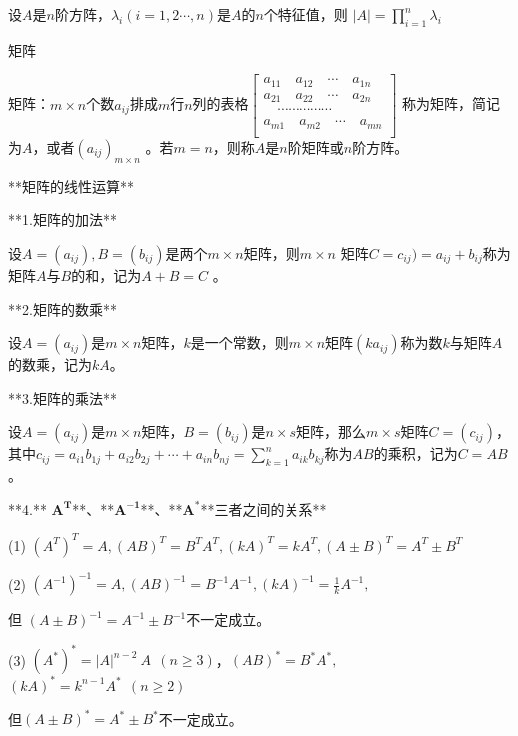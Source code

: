 设$A$是$n$阶方阵，$\lambda_{i}(i = 1,2\cdots,n)$是$A$的$n$个特征值，则
$|A| = \prod_{i = 1}^{n}\lambda_{i}$

矩阵

矩阵：$m \times n$个数$a_{{ij}}$排成$m$行$n$列的表格$\begin{bmatrix}  a_{11}\quad a_{12}\quad\cdots\quad a_{1n} \\ a_{21}\quad a_{22}\quad\cdots\quad a_{2n} \\ \quad\cdots\cdots\cdots\cdots\cdots \\  a_{m1}\quad a_{m2}\quad\cdots\quad a_{{mn}} \\ \end{bmatrix}$ 称为矩阵，简记为$A$，或者$\left( a_{{ij}} \right)_{m \times n}$ 。若$m = n$，则称$A$是$n$阶矩阵或$n$阶方阵。

**矩阵的线性运算**

**1.矩阵的加法**

设$A = (a_{{ij}}),B = (b_{{ij}})$是两个$m \times n$矩阵，则$m \times n$ 矩阵$C = c_{{ij}}) = a_{{ij}} + b_{{ij}}$称为矩阵$A$与$B$的和，记为$A + B = C$ 。

**2.矩阵的数乘**

设$A = (a_{{ij}})$是$m \times n$矩阵，$k$是一个常数，则$m \times n$矩阵$(ka_{{ij}})$称为数$k$与矩阵$A$的数乘，记为${kA}$。

**3.矩阵的乘法**

设$A = (a_{{ij}})$是$m \times n$矩阵，$B = (b_{{ij}})$是$n \times s$矩阵，那么$m \times s$矩阵$C = (c_{{ij}})$，其中$c_{{ij}} = a_{i1}b_{1j} + a_{i2}b_{2j} + \cdots + a_{{in}}b_{{nj}} = \sum_{k =1}^{n}{a_{{ik}}b_{{kj}}}$称为${AB}$的乘积，记为$C = AB$ 。

**4.** $\mathbf{A}^{\mathbf{T}}$**、**$\mathbf{A}^{\mathbf{-1}}$**、**$\mathbf{A}^{\mathbf{*}}$**三者之间的关系**

(1) ${(A^{T})}^{T} = A,{(AB)}^{T} = B^{T}A^{T},{(kA)}^{T} = kA^{T},{(A \pm B)}^{T} = A^{T} \pm B^{T}$

(2) $\left( A^{- 1} \right)^{- 1} = A,\left( {AB} \right)^{- 1} = B^{- 1}A^{- 1},\left( {kA} \right)^{- 1} = \frac{1}{k}A^{- 1},$

但 ${(A \pm B)}^{- 1} = A^{- 1} \pm B^{- 1}$不一定成立。

(3) $\left( A^{*} \right)^{*} = |A|^{n - 2}\ A\ \ (n \geq 3)$，$\left({AB} \right)^{*} = B^{*}A^{*},$ $\left( {kA} \right)^{*} = k^{n -1}A^{*}{\ \ }\left( n \geq 2 \right)$

但$\left( A \pm B \right)^{*} = A^{*} \pm B^{*}$不一定成立。

